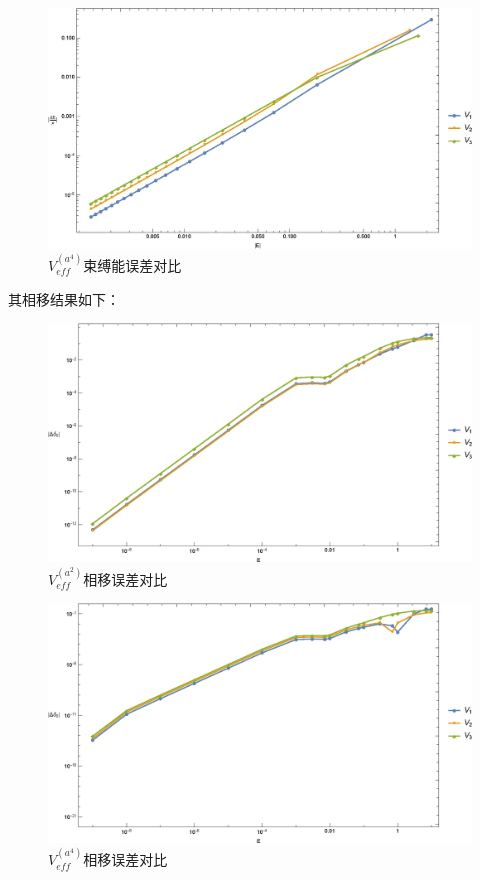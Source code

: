 \documentclass[hyperref,cs4size,titlepage,twoside]{ctexart}
\begin{document}
\begin{figure}[!htbp]
  \centering
  \includegraphics[width=6in]{MultiplePotential_5.eps}
  \caption{$V_{eff}^{(a^4)}$束缚能误差对比}
\end{figure}
\clearpage
其相移结果如下：
\begin{figure}[!htbp]
  \centering
  \includegraphics[width=6in]{MultiplePotential_4.eps}
  \caption{$V_{eff}^{(a^2)}$相移误差对比}
\end{figure}
\begin{figure}[!htbp]
  \centering
  \includegraphics[width=6in]{MultiplePotential_6.eps}
  \caption{$V_{eff}^{(a^4)}$相移误差对比}
\end{figure}
\end{document}
